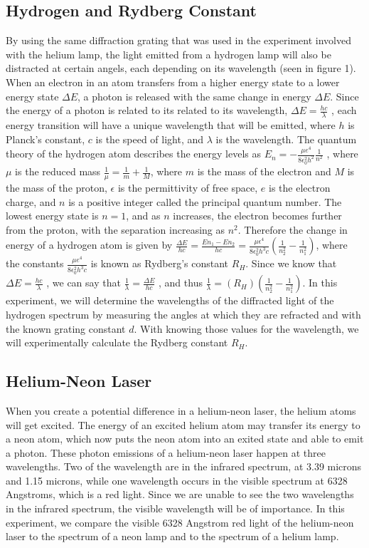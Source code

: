 \documentclass[a4paper]{article}
\begin{document}
\subsection{Hydrogen and Rydberg Constant}
By using the same diffraction grating that was used in the experiment involved with the helium lamp, the light emitted from a hydrogen lamp will also be distracted at certain angels, each depending on its wavelength (seen in figure 1). When an electron in an atom transfers from a higher energy state to a lower energy state $\Delta E$, a photon is released with the same change in energy $\Delta E$. Since the energy of a photon is related to its related to its wavelength, $\Delta E = \frac{hc}{\lambda}$ , each energy transition will have a unique wavelength that will be emitted, where $h$ is Planck’s constant, $c$ is the speed of light, and $\lambda$ is the wavelength. The quantum theory of the hydrogen atom describes the energy levels as $E_n = − \frac{\mu e^4}{8\epsilon_0 ^2h^2}\frac{1}{n^2}$ , where $\mu$ is the reduced mass $\frac{1}{\mu} = \frac{1}{m}+\frac{1}{M}$, where $m$ is the mass of the electron and $M$ is the mass of the proton, $\epsilon$ is the permittivity of free space, $e$ is the electron charge, and $n$ is a positive integer called the principal quantum number. The lowest energy state is $n = 1$, and as $n$ increases, the electron becomes further from the proton, with the separation increasing as $n^2$. Therefore the change in energy of a hydrogen atom is given by $\frac{\Delta E}{hc} = \frac{En_1−En_2}{hc} = \frac{\mu \epsilon^4}{8\epsilon_0 ^2h^3 c}(\frac{1}{n_2 ^2}-\frac{1}{n_1 ^2})$, where the constants $\frac{\mu e^4}{8\epsilon_0 ^2h^3 c}$ is known as Rydberg's constant $R_H$. Since we know that $\Delta E = \frac{hc}{\lambda}$ , we can say that $\frac{1}{\lambda} = \frac{\Delta E}{hc}$ , and thus $\frac{1}{\lambda} = (R_H)( \frac{1}{n_2 ^2}-\frac{1}{n_1 ^2} )$. In this experiment, we will determine the wavelengths of the diffracted light of the hydrogen spectrum by measuring the angles at which they are refracted and with the known grating constant $d$. With knowing those values for the wavelength, we will experimentally calculate the Rydberg constant $R_H$.

\subsection{Helium-Neon Laser}
When you create a potential difference in a helium-neon laser, the helium atoms will get excited. The energy of an excited helium atom may transfer its energy to a neon atom, which now puts the neon atom into an exited state and able to emit a photon. These photon emissions of a helium-neon laser happen at three wavelengths. Two of the wavelength are in the infrared spectrum, at 3.39 microns and 1.15 microns, while one wavelength occurs in the visible spectrum at 6328 Angstroms, which is a red light. Since we are unable to see the two wavelengths in the infrared spectrum, the visible wavelength will be of importance. In this experiment, we compare the visible 6328 Angstrom red light of the helium-neon laser to the spectrum of a neon lamp and to the spectrum of a helium lamp.
\end{document}
